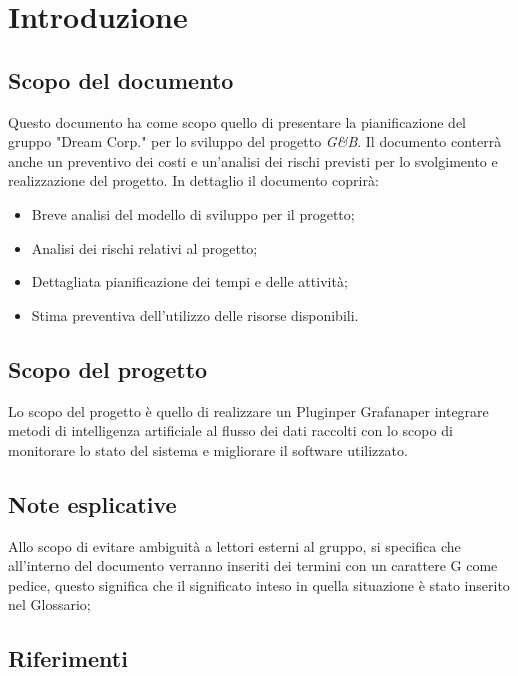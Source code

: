 \section{Introduzione}
		\subsection{Scopo del documento}

			Questo documento ha come scopo quello di presentare la pianificazione del gruppo "Dream Corp." per lo sviluppo del progetto \textit{G\&B}.
			Il documento conterrà anche un preventivo dei costi e un'analisi dei rischi previsti per lo svolgimento e realizzazione del progetto.\newline
			In dettaglio il documento coprirà:
			\begin{itemize}
				\item Breve analisi del modello di sviluppo per il progetto; 
				\item Analisi dei rischi relativi al progetto;
				\item Dettagliata pianificazione dei tempi e delle attività;
				\item Stima preventiva dell'utilizzo delle risorse disponibili.
			\end{itemize}

		\subsection{Scopo del progetto}

			Lo scopo del progetto è quello di realizzare un Plugin\pedice per Grafana\pedice per integrare metodi di intelligenza artificiale al flusso dei dati raccolti con lo scopo di monitorare lo stato del sistema e migliorare il software utilizzato.

		\subsection{Note esplicative}

			Allo scopo di evitare ambiguità a lettori esterni al gruppo, si specifica che all'interno del documento verranno inseriti dei termini con un carattere G come pedice, questo significa che il significato inteso in quella situazione è stato inserito nel Glossario;

		\newpage
		\subsection{Riferimenti}

